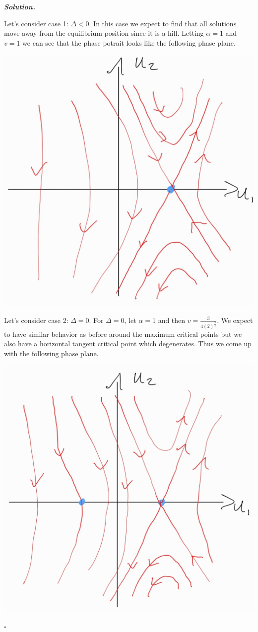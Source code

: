 \documentclass[12pt]{report}
\newenvironment{solution}[1][\it{Solution}]{\textbf{#1. } }{$\square$}
\begin{document}
\begin{solution}
\begin{enumerate}
        \noindent 
        Let's consider case 1: $\Delta < 0$. In this case we expect to find that all solutions move away from the equilibrium position since it is a hill. Letting $\alpha = 1$ and $v=1$ we can see that the phase potrait looks like the following phase plane.

        \begin{center}
            \includegraphics[width=.6\textwidth]{plots/4b-phase1.jpg}
        \end{center}        

        \noindent 
        Let's consider case 2: $\Delta = 0$. For $\Delta = 0$, let $\alpha = 1$ and then $v = \frac{3}{4(2)^{\frac{3}{2}}}$. We expect to have similar behavior as before around the maximum critical points but we also have a horizontal tangent critical point which degenerates. Thus we come up with the following phase plane.

        \begin{center}
            \includegraphics[width=.6\textwidth]{plots/4b-phase2.jpg}
        \end{center}


\end{enumerate}
\end{solution}
\end{document}
